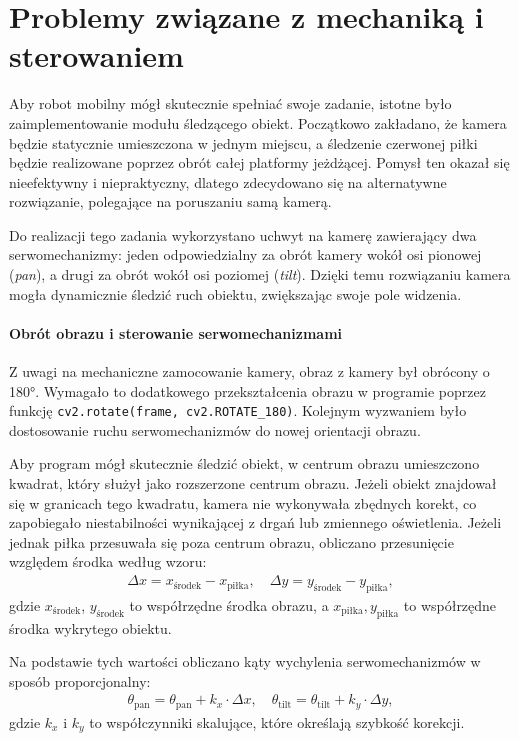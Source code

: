 \documentclass[a4paper,twoside,12pt]{book}
\begin{document}
\newpage
\section{Problemy związane z mechaniką i sterowaniem}

Aby robot mobilny mógł skutecznie spełniać swoje zadanie, istotne było zaimplementowanie modułu śledzącego obiekt. Początkowo zakładano, że kamera będzie statycznie umieszczona w jednym miejscu, a śledzenie czerwonej piłki będzie realizowane poprzez obrót całej platformy jeżdżącej. Pomysł ten okazał się nieefektywny i niepraktyczny, dlatego zdecydowano się na alternatywne rozwiązanie, polegające na poruszaniu samą kamerą. 

Do realizacji tego zadania wykorzystano uchwyt na kamerę zawierający dwa serwomechanizmy: jeden odpowiedzialny za obrót kamery wokół osi pionowej (\textit{pan}), a drugi za obrót wokół osi poziomej (\textit{tilt}). Dzięki temu rozwiązaniu kamera mogła dynamicznie śledzić ruch obiektu, zwiększając swoje pole widzenia.

\paragraph{Obrót obrazu i sterowanie serwomechanizmami} 
Z uwagi na mechaniczne zamocowanie kamery, obraz z kamery był obrócony o 180°. Wymagało to dodatkowego przekształcenia obrazu w programie poprzez funkcję \texttt{cv2.rotate(frame, cv2.ROTATE\_180)}. Kolejnym wyzwaniem było dostosowanie ruchu serwomechanizmów do nowej orientacji obrazu.

Aby program mógł skutecznie śledzić obiekt, w centrum obrazu umieszczono kwadrat, który służył jako rozszerzone centrum obrazu. Jeżeli obiekt znajdował się w granicach tego kwadratu, kamera nie wykonywała zbędnych korekt, co zapobiegało niestabilności wynikającej z drgań lub zmiennego oświetlenia. Jeżeli jednak piłka przesuwała się poza centrum obrazu, obliczano przesunięcie względem środka według wzoru:
\begin{align}
    \Delta x = x_{\text{środek}} - x_{\text{piłka}}, \quad \Delta y = y_{\text{środek}} - y_{\text{piłka}},
\end{align}
gdzie $x_{\text{środek}}$, $y_{\text{środek}}$ to współrzędne środka obrazu, a $x_{\text{piłka}}, y_{\text{piłka}}$ to współrzędne środka wykrytego obiektu.

Na podstawie tych wartości obliczano kąty wychylenia serwomechanizmów w sposób proporcjonalny:
\begin{align}
    \theta_{\text{pan}} = \theta_{\text{pan}} + k_x \cdot \Delta x, \quad 
    \theta_{\text{tilt}} = \theta_{\text{tilt}} + k_y \cdot \Delta y,
\end{align}
gdzie $k_x$ i $k_y$ to współczynniki skalujące, które określają szybkość korekcji.
\end{document}
